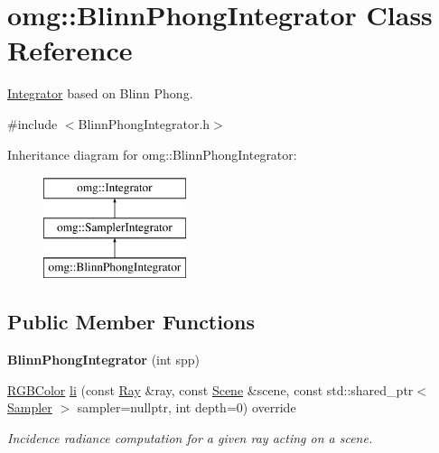 \hypertarget{classomg_1_1_blinn_phong_integrator}{}\section{omg\+::Blinn\+Phong\+Integrator Class Reference}
\label{classomg_1_1_blinn_phong_integrator}


\mbox{\hyperlink{classomg_1_1_integrator}{Integrator}} based on Blinn Phong.  




{\ttfamily \#include $<$Blinn\+Phong\+Integrator.\+h$>$}

Inheritance diagram for omg\+::Blinn\+Phong\+Integrator\+:\begin{figure}[H]
\begin{center}
\leavevmode
\includegraphics[height=3.000000cm]{classomg_1_1_blinn_phong_integrator}
\end{center}
\end{figure}
\subsection*{Public Member Functions}
\begin{DoxyCompactItemize}
\item 
\mbox{\label{classomg_1_1_blinn_phong_integrator_a77a8fcab6b06486fcc070d4481900a8e}} 
{\bfseries Blinn\+Phong\+Integrator} (int spp)
\item 
\mbox{\hyperlink{namespaceomg_a7b0e3f3dcf76f2b4758c314a41885917}{R\+G\+B\+Color}} \mbox{\hyperlink{classomg_1_1_blinn_phong_integrator_a5a55ac71748932d2697dcec8262900f2}{li}} (const \mbox{\hyperlink{classomg_1_1_ray}{Ray}} \&ray, const \mbox{\hyperlink{classomg_1_1_scene}{Scene}} \&scene, const std\+::shared\+\_\+ptr$<$ \mbox{\hyperlink{classomg_1_1_sampler}{Sampler}} $>$ sampler=nullptr, int depth=0) override
\begin{DoxyCompactList}\small\item\em Incidence radiance computation for a given ray acting on a scene. \end{DoxyCompactList}\end{DoxyCompactItemize}
